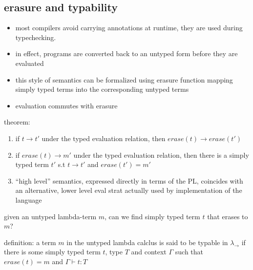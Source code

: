 \documentclass[11pt]{article}
\begin{document}
\subsection{erasure and typability}
\label{sec:org32708e1}
\begin{itemize}
\item most compilers avoid carrying annotations at runtime, they are used during typechecking.
\item in effect, programs are converted back to an untyped form before they are evaluated
\item this style of semantics can be formalized using erasure function mapping simply typed terms into the corresponding untyped terms
\item evaluation commutes with erasure
\end{itemize}


theorem:
\begin{enumerate}
\item if \(t \rightarrow t'\) under the typed evaluation relation, then \(erase(t) \rightarrow erase(t')\)
\item if \(erase(t) \rightarrow m'\) under the typed evaluation relation, then there is a simply typed term \(t'\) s.t \(t \rightarrow t'\) and \(erase(t') = m'\)

\item ``high level'' semantics, expressed directly in terms of the PL, coincides with an alternative, lower level eval strat actually used by implementation of the language
\end{enumerate}

given an untyped lambda-term \(m\), can we find simply typed term \(t\) that erases to \(m\)?

definition: a term \(m\) in the untyped lambda calclus is said to be typable in \(\lambda_{\rightarrow}\) if there is some simply typed term \(t\), type \(T\) and context \(\Gamma\) such that \(erase(t) = m\) and \(\Gamma \vdash t : T\)
\end{document}
